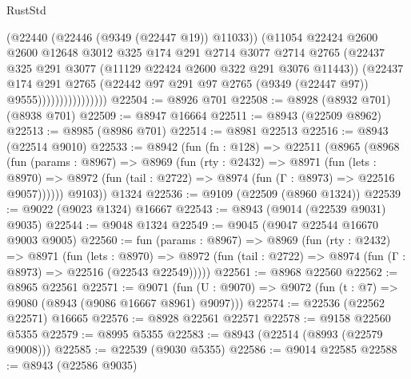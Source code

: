 \begin{lexlean}{RustStd}
\begin{coremodule}
                              (@22440 (@22446 (@9349 (@22447 @19)) @11033))
                              (@11054
                                @22424
                                @2600
                                @2600
                                @12648
                                @3012
                                @325
                                @174
                                @291
                                @2714
                                @3077
                                @2714
                                @2765
                                (@22437
                                  @325
                                  @291
                                  @3077
                                  (@11129 @22424 @2600 @322 @291 @3076 @11443))
                                (@22437
                                  @174
                                  @291
                                  @2765
                                  (@22442
                                    @97
                                    @291
                                    @97
                                    @2765
                                    (@9349 (@22447 @97))
                                    @9555))))))))))))))))
@22504 := @8926 @701
@22508 := @8928 (@8932 @701) (@8938 @701)
@22509 := @8947 @16664
@22511 := @8943 (@22509 @8962)
@22513 := @8985 (@8986 @701)
@22514 := @8981 @22513
@22516 := @8943 (@22514 @9010)
@22533 := @8942
    (fun (fn : @128) =>
    @22511
      (@8965
        (@8968
          (fun (params : @8967) =>
          @8969
            (fun (rty : @2432) =>
            @8971
              (fun (lets : @8970) =>
              @8972 (fun (tail : @2722) => @8974 (fun (Γ : @8973) => @22516 @9057))))))
        @9103))
    @1324
@22536 := @9109 (@22509 (@8960 @1324))
@22539 := @9022 (@9023 @1324) @16667
@22543 := @8943 (@9014 (@22539 @9031) @9035)
@22544 := @9048 @1324
@22549 := @9045 (@9047 @22544 @16670 @9003 @9005)
@22560 := fun (params : @8967) =>
  @8969
    (fun (rty : @2432) =>
    @8971
      (fun (lets : @8970) =>
      @8972 (fun (tail : @2722) => @8974 (fun (Γ : @8973) => @22516 (@22543 @22549)))))
@22561 := @8968 @22560
@22562 := @8965 @22561
@22571 := @9071
    (fun (U : @9070) => @9072 (fun (t : @7) => @9080 (@8943 (@9086 @16667 @8961) @9097)))
@22574 := @22536 (@22562 @22571) @16665
@22576 := @8928 @22561 @22571
@22578 := @9158 @22560 @5355
@22579 := @8995 @5355
@22583 := @8943 (@22514 (@8993 (@22579 @9008)))
@22585 := @22539 (@9030 @5355)
@22586 := @9014 @22585
@22588 := @8943 (@22586 @9035)

\end{coremodule}
\end{lexlean}
